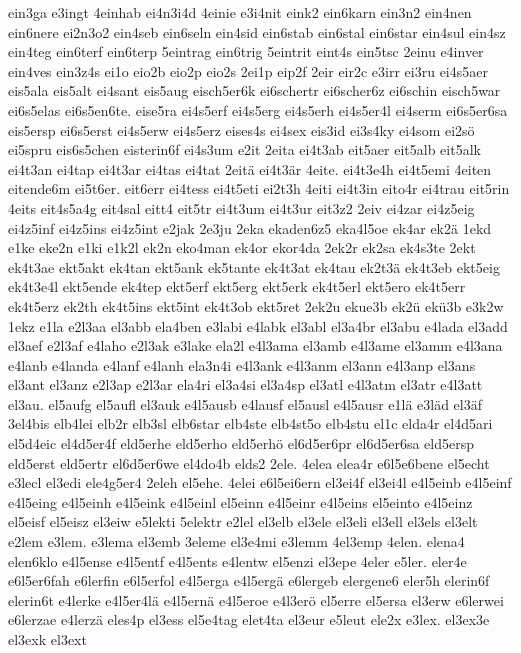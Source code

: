 {ein3ga
e3ingt
4einhab
ei4n3i4d
4einie
e3i4nit
eink2
ein6karn
ein3n2
ein4nen
ein6nere
ei2n3o2
ein4seb
ein6seln
ein4sid
ein6stab
ein6stal
ein6star
ein4sul
ein4sz
ein4teg
ein6terf
ein6terp
5eintrag
ein6trig
5eintrit
eint4s
ein5tsc
2einu
e4inver
ein4ves
ein3z4s
ei1o
eio2b
eio2p
eio2s
2ei1p
eip2f
2eir
eir2c
e3irr
ei3ru
ei4s5aer
eis5ala
eis5alt
ei4sant
eis5aug
eisch5er6k
ei6schertr
ei6scher6z
ei6schin
eisch5war
ei6s5elas
ei6s5en6te.
eise5ra
ei4s5erf
ei4s5erg
ei4s5erh
ei4s5er4l
ei4serm
ei6s5er6sa
eis5ersp
ei6s5erst
ei4s5erw
ei4s5erz
eises4s
ei4sex
eis3id
ei3s4ky
ei4som
ei2sö
ei5spru
eis6s5chen
eisterin6f
ei4s3um
e2it
2eita
ei4t3ab
eit5aer
eit5alb
eit5alk
ei4t3an
ei4tap
ei4t3ar
ei4tas
ei4tat
2eitä
ei4t3är
4eite.
ei4t3e4h
ei4t5emi
4eiten
eitende6m
ei5t6er.
eit6err
ei4tess
ei4t5eti
ei2t3h
4eiti
ei4t3in
eito4r
ei4trau
eit5rin
4eits
eit4s5a4g
eit4sal
eitt4
eit5tr
ei4t3um
ei4t3ur
eit3z2
2eiv
ei4zar
ei4z5eig
ei4z5inf
ei4z5ins
ei4z5int
e2jak
2e3ju
2eka
ekaden6z5
eka4l5oe
ek4ar
ek2ä
1ekd
e1ke
eke2n
e1ki
e1k2l
ek2n
eko4man
ek4or
ekor4da
2ek2r
ek2sa
ek4s3te
2ekt
ek4t3ae
ekt5akt
ek4tan
ekt5ank
ek5tante
ek4t3at
ek4tau
ek2t3ä
ek4t3eb
ekt5eig
ek4t3e4l
ekt5ende
ek4tep
ekt5erf
ekt5erg
ekt5erk
ek4t5erl
ekt5ero
ek4t5err
ek4t5erz
ek2th
ek4t5ins
ekt5int
ek4t3ob
ekt5ret
2ek2u
ekue3b
ek2ü
ekü3b
e3k2w
1ekz
e1la
e2l3aa
el3abb
ela4ben
e3labi
e4labk
el3abl
el3a4br
el3abu
e4lada
el3add
el3aef
e2l3af
e4laho
e2l3ak
e3lake
ela2l
e4l3ama
el3amb
e4l3ame
el3amm
e4l3ana
e4lanb
e4landa
e4lanf
e4lanh
ela3n4i
e4l3ank
e4l3anm
el3ann
e4l3anp
el3ans
el3ant
el3anz
e2l3ap
e2l3ar
ela4ri
el3a4si
el3a4sp
el3atl
e4l3atm
el3atr
e4l3att
el3au.
el5aufg
el5aufl
el3auk
e4l5ausb
e4lausf
el5ausl
e4l5ausr
e1lä
e3läd
el3äf
3el4bis
elb4lei
elb2r
elb3sl
elb6star
elb4ste
elb4st5o
elb4stu
el1c
elda4r
el4d5ari
el5d4eic
el4d5er4f
eld5erhe
eld5erho
eld5erhö
el6d5er6pr
el6d5er6sa
eld5ersp
eld5erst
eld5ertr
el6d5er6we
el4do4b
elds2
2ele.
4elea
elea4r
e6l5e6bene
el5echt
e3lecl
el3edi
ele4g5er4
2eleh
el5ehe.
4elei
e6l5ei6ern
el3ei4f
el3ei4l
e4l5einb
e4l5einf
e4l5eing
e4l5einh
e4l5eink
e4l5einl
el5einn
e4l5einr
e4l5eins
el5einto
e4l5einz
el5eisf
el5eisz
el3eiw
e5lekti
5elektr
e2lel
el3elb
el3ele
el3eli
el3ell
el3els
el3elt
e2lem
e3lem.
e3lema
el3emb
3eleme
el3e4mi
e3lemm
4el3emp
4elen.
elena4
elen6klo
e4l5ense
e4l5entf
e4l5ents
e4lentw
el5enzi
el3epe
4eler
e5ler.
eler4e
e6l5er6fah
e6lerfin
e6l5erfol
e4l5erga
e4l5ergä
e6lergeb
elergene6
eler5h
elerin6f
elerin6t
e4lerke
e4l5er4lä
e4l5ernä
e4l5eroe
e4l3erö
el5erre
el5ersa
el3erw
e6lerwei
e6lerzae
e4lerzä
eles4p
el3ess
el5e4tag
elet4ta
el3eur
e5leut
ele2x
e3lex.
el3ex3e
el3exk
el3ext
}
